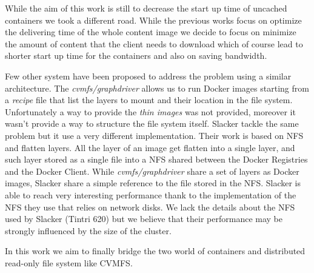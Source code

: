 While the aim of this work is still to decrease the start up time of uncached
containers we took a different road. While the previous works focus on optimize
the delivering time of the whole content image we decide to focus on minimize
the amount of content that the client needs to download which of course lead to
shorter start up time for the containers and also on saving bandwidth.

Few other system have been proposed to address the problem using a similar
architecture. The \textit{cvmfs/graphdriver} \cite{graphdriver-plugin} allows
us to run Docker images starting from a \textit{recipe} file that  list the
layers to mount and their location in the file system. Unfortunately a way to
provide the \textit{thin images} was not provided, moreover it wasn't provide a
way to structure the file system itself. Slacker \cite{slacker} tackle the same
problem but it use a very different implementation. Their work is based on NFS
and flatten layers. All the layer of an image get flatten into a single layer,
and such layer stored as a single file into a NFS shared between the Docker
Registries and the Docker Client. While \textit{cvmfs/graphdriver} share a set
of layers as Docker images, Slacker share a simple reference to the file stored
in the NFS. Slacker is able to reach very interesting performance thank to the
implementation of the NFS they use that relies on network disks. We lack the
details about the NFS used by Slacker (Tintri 620) but we believe that their
performance may be strongly influenced by the size of the cluster.

In this work we aim to finally bridge the two world of containers and
distributed read-only file system like CVMFS.


